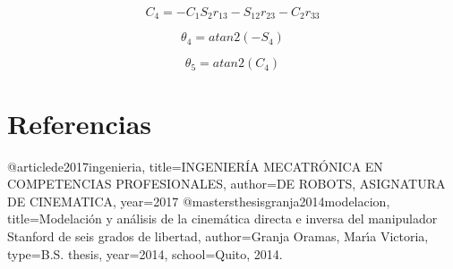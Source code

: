 \documentclass[letter,openright,12pt,spanish]{report}
\begin{document}
\begin{displaymath}
C_4=-C_1S_2r_13-S_12r_23-C_2r_33
\end{displaymath}

\begin{displaymath}
\theta_4=atan2(-S_4)
\end{displaymath}

\begin{displaymath}
\theta_5=atan2(C_4)
\end{displaymath}
\section{Referencias}
@article{de2017ingenieria,
  title={INGENIER{\'I}A MECATR{\'O}NICA EN COMPETENCIAS PROFESIONALES},
  author={DE ROBOTS, ASIGNATURA DE CINEMATICA},
  year={2017}
}
@mastersthesis{granja2014modelacion,
  title={Modelaci{\'o}n y an{\'a}lisis de la cinem{\'a}tica directa e inversa del manipulador Stanford de seis grados de libertad},
  author={Granja Oramas, Mar{\'\i}a Victoria},
  type={{B.S.} thesis},
  year={2014},
  school={Quito, 2014.}
}


\end{document}
